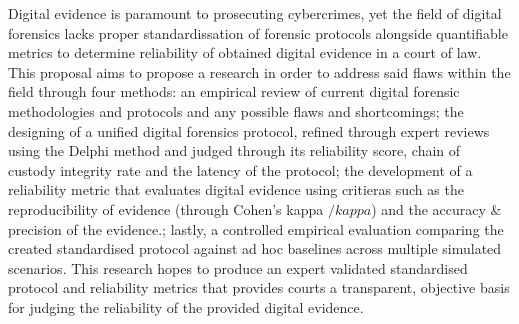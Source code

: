 \documentclass[a4paper]{report}
\begin{document}
\begin{justify}

Digital evidence is paramount to prosecuting cybercrimes, yet the field of digital forensics lacks proper standardissation of forensic protocols alongside quantifiable metrics to determine reliability of obtained digital evidence in a court of law. 
This proposal aims to propose a research in order to address said flaws within the field through four methods: an empirical review of current digital forensic methodologies and protocols and any possible flaws and shortcomings; the designing of a unified digital forensics protocol, refined through expert reviews using the Delphi method and judged through its reliability score, chain of custody integrity rate and the latency of the protocol; the development of a reliability metric that evaluates digital evidence using critieras such as the reproducibility of evidence (through Cohen's kappa $/kappa$) and the accuracy \& precision of the evidence.; lastly, a controlled empirical evaluation comparing the created standardised protocol against ad hoc baselines across multiple simulated scenarios. 
This research hopes to produce an expert validated standardised protocol and reliability metrics that provides courts a transparent, objective basis for judging the reliability of the provided digital evidence.

\vspace{0.3cm}

\end{justify}





\newpage

\tableofcontents

\end{document}
